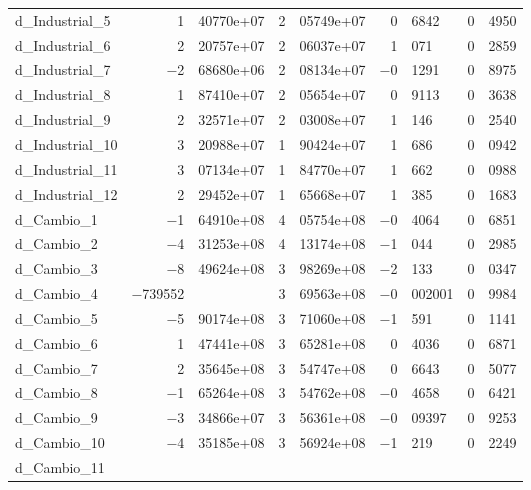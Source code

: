 \documentclass[11pt]{article}
\begin{document}
\begin{center}
\begin{tabular}{lr@{,}lr@{,}lr@{,}lr@{,}l}
d\_Industrial\_5 &
  1&40770\textrm{e+07} &
    2&05749\textrm{e+07} &
      0&6842 &
        0&4950 \\
d\_Industrial\_6 &
  2&20757\textrm{e+07} &
    2&06037\textrm{e+07} &
      1&071 &
        0&2859 \\
d\_Industrial\_7 &
  $-$2&68680\textrm{e+06} &
    2&08134\textrm{e+07} &
      $-$0&1291 &
        0&8975 \\
d\_Industrial\_8 &
  1&87410\textrm{e+07} &
    2&05654\textrm{e+07} &
      0&9113 &
        0&3638 \\
d\_Industrial\_9 &
  2&32571\textrm{e+07} &
    2&03008\textrm{e+07} &
      1&146 &
        0&2540 \\
d\_Industrial\_10 &
  3&20988\textrm{e+07} &
    1&90424\textrm{e+07} &
      1&686 &
        0&0942 \\
d\_Industrial\_11 &
  3&07134\textrm{e+07} &
    1&84770\textrm{e+07} &
      1&662 &
        0&0988 \\
d\_Industrial\_12 &
  2&29452\textrm{e+07} &
    1&65668\textrm{e+07} &
      1&385 &
        0&1683 \\
d\_Cambio\_1 &
  $-$1&64910\textrm{e+08} &
    4&05754\textrm{e+08} &
      $-$0&4064 &
        0&6851 \\
d\_Cambio\_2 &
  $-$4&31253\textrm{e+08} &
    4&13174\textrm{e+08} &
      $-$1&044 &
        0&2985 \\
d\_Cambio\_3 &
  $-$8&49624\textrm{e+08} &
    3&98269\textrm{e+08} &
      $-$2&133 &
        0&0347 \\
d\_Cambio\_4 &
  $-$739552& &
    3&69563\textrm{e+08} &
      $-$0&002001 &
        0&9984 \\
d\_Cambio\_5 &
  $-$5&90174\textrm{e+08} &
    3&71060\textrm{e+08} &
      $-$1&591 &
        0&1141 \\
d\_Cambio\_6 &
  1&47441\textrm{e+08} &
    3&65281\textrm{e+08} &
      0&4036 &
        0&6871 \\
d\_Cambio\_7 &
  2&35645\textrm{e+08} &
    3&54747\textrm{e+08} &
      0&6643 &
        0&5077 \\
d\_Cambio\_8 &
  $-$1&65264\textrm{e+08} &
    3&54762\textrm{e+08} &
      $-$0&4658 &
        0&6421 \\
d\_Cambio\_9 &
  $-$3&34866\textrm{e+07} &
    3&56361\textrm{e+08} &
      $-$0&09397 &
        0&9253 \\
d\_Cambio\_10 &
  $-$4&35185\textrm{e+08} &
    3&56924\textrm{e+08} &
      $-$1&219 &
        0&2249 \\
d\_Cambio\_11 &

\end{tabular}
\end{center}
\end{document}
